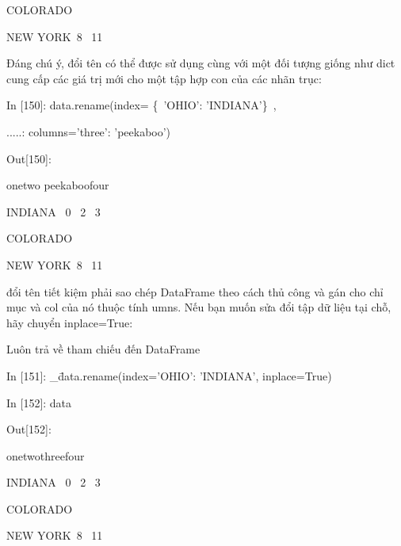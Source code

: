     \quad\textup{COLORADO \quad\  \quad\   \quad {}  }\par
    \quad\textup{NEW YORK\quad\  8 \quad {} \quad{} \quad\      11  }\par  
Đáng chú ý, đổi tên có thể được sử dụng cùng với một đối tượng giống như dict cung cấp các giá trị mới 
cho một tập hợp con của các nhãn trục: \par
     \quad\textup{In [150]: data.rename(index= \{\ 'OHIO': 'INDIANA'\}\ , }\par
     \quad\textup{ .....: \quad\quad\quad\quad\quad\quad            columns={'three': 'peekaboo'})   }\par
    \quad\textup{Out[150]: }\par
    \quad\quad\quad\textup{\quad\quad\quad\quad one\quad   two  peekaboo\quad   four   }\par
    \quad\textup{INDIANA \quad\quad\    0 \quad{}\quad\quad\         2 \quad\quad\     3  }\par
    \quad\textup{COLORADO \quad\  \quad\   \quad {}  }\par
    \quad\textup{NEW YORK\quad\  8 \quad {} \quad{} \quad\      11  }\par  
đổi tên tiết kiệm phải sao chép DataFrame theo cách thủ công và gán cho chỉ mục và col của nó 
thuộc tính umns. Nếu bạn muốn sửa đổi tập dữ liệu tại chỗ, hãy chuyển inplace=True:\par
 Luôn trả về tham chiếu đến DataFrame\par
    \quad\textup{In [151]: \_\= data.rename(index={'OHIO': 'INDIANA'}, inplace=True)}\par
    \quad\textup{In [152]: data  }\par
    \quad\textup{Out[152]:  }\par
    \quad\quad\quad\textup{\quad\quad\quad\quad one\quad  two\quad three\quad  four }\par
    \quad\textup{INDIANA \quad\quad\    0 \quad{}\quad\quad\         2 \quad\quad\     3  }\par
    \quad\textup{COLORADO \quad\  \quad\   \quad {}  }\par
    \quad\textup{NEW YORK\quad\  8 \quad {} \quad{} \quad\      11  }\par  

